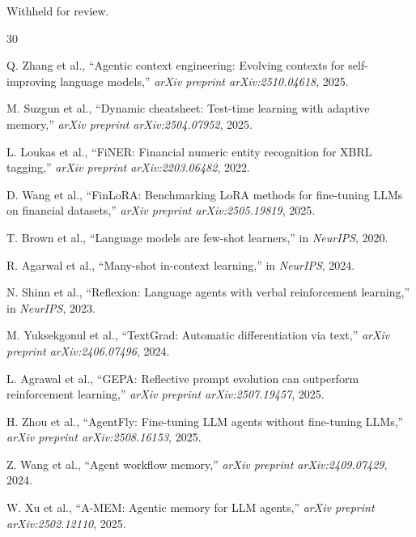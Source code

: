 \documentclass[12pt,a4paper]{article}
\begin{document}
Withheld for review.


\begin{thebibliography}{30}

Q. Zhang et al., ``Agentic context engineering: Evolving contexts for self-improving language models,'' \textit{arXiv preprint arXiv:2510.04618}, 2025.

M. Suzgun et al., ``Dynamic cheatsheet: Test-time learning with adaptive memory,'' \textit{arXiv preprint arXiv:2504.07952}, 2025.

L. Loukas et al., ``FiNER: Financial numeric entity recognition for XBRL tagging,'' \textit{arXiv preprint arXiv:2203.06482}, 2022.

D. Wang et al., ``FinLoRA: Benchmarking LoRA methods for fine-tuning LLMs on financial datasets,'' \textit{arXiv preprint arXiv:2505.19819}, 2025.

T. Brown et al., ``Language models are few-shot learners,'' in \textit{NeurIPS}, 2020.

R. Agarwal et al., ``Many-shot in-context learning,'' in \textit{NeurIPS}, 2024.

N. Shinn et al., ``Reflexion: Language agents with verbal reinforcement learning,'' in \textit{NeurIPS}, 2023.

M. Yuksekgonul et al., ``TextGrad: Automatic differentiation via text,'' \textit{arXiv preprint arXiv:2406.07496}, 2024.

L. Agrawal et al., ``GEPA: Reflective prompt evolution can outperform reinforcement learning,'' \textit{arXiv preprint arXiv:2507.19457}, 2025.

H. Zhou et al., ``AgentFly: Fine-tuning LLM agents without fine-tuning LLMs,'' \textit{arXiv preprint arXiv:2508.16153}, 2025.

Z. Wang et al., ``Agent workflow memory,'' \textit{arXiv preprint arXiv:2409.07429}, 2024.

W. Xu et al., ``A-MEM: Agentic memory for LLM agents,'' \textit{arXiv preprint arXiv:2502.12110}, 2025.


\end{thebibliography}
\end{document}
